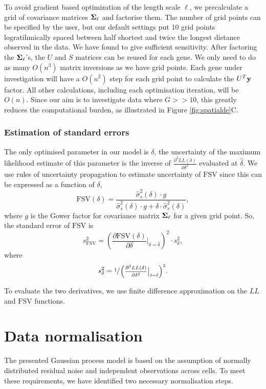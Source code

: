 To avoid gradient based optimization of the length scale \( \ell \), we precalculate a grid of covariance matrices \( \mbox{\boldmath $\Sigma$}_\ell \) and factorise them. The number of grid points can be specified by the user, but our default settings put 10 grid points logratihmically spaced between half shortest and twice the longest distance observed in the data. We have found to give sufficient sensitivity. After factoring the \( \mbox{\boldmath $\Sigma$}_\ell \)'s, the \( U \) and \( S \) matrices can be reused for each gene. We only need to do as many \( O(n^3) \) matrix inversions as we have grid points. Each gene under investigation will have a \( O(n^2) \) step for each grid point to calculate the \( U^T{\bf y} \) factor. All other calculations, including each optimisation iteration, will be \( O(n) \). Since our aim is to investigate data where \( G >> 10 \), this greatly reduces the computational burden, as illustrated in Figure \ref{fig:spatialde}C.

\subsubsection*{Estimation of standard errors}

The only optimised parameter in our model is \( \delta \), the uncertainty of the maximum likelihood estimate of this parameter is the inverse of \( \frac{\partial^2 LL(\delta)}{\partial \delta^2} \) evaluated at \( \hat{\delta} \). We use rules of uncertainty propagation to estimate uncertainty of \( \text{FSV} \) since this can be expressed as a function of \( \delta \),
\[
\text{FSV}(\delta) = \frac{\hat{\sigma}^2_s(\delta) \cdot g}{\hat{\sigma}^2_s(\delta) \cdot g + \delta \cdot \hat{\sigma}^2_s(\delta)},
\]
where \( g \) is the Gower factor for covariance matrix \( \mbox{\boldmath $\Sigma$}_\ell \) for a given grid point. So, the standard error of \( \text{FSV} \) is
\[
s_{\text{FSV}}^2 = \left(\frac{\partial \text{FSV}(\delta)}{\partial \delta} \Bigr|_{\delta = \hat{\delta}}\right)^2 \cdot s_\delta^2,
\]
where
\[
s^2_\delta = \sfrac{1}{\left(\frac{\partial^2 LL(\delta)}{\partial \delta^2} \Bigr|_{\delta = \hat{\delta}}\right)^2}.
\]

To evaluate the two derivatives, we use finite difference approximation on the \( LL \) and \( \text{FSV} \) functions.

\section{Data normalisation}

The presented Gaussian process model is based on the assumption of normally distributed residual noise and independent observations across cells. To meet these requirements, we have identified two necessary normalisation steps.

